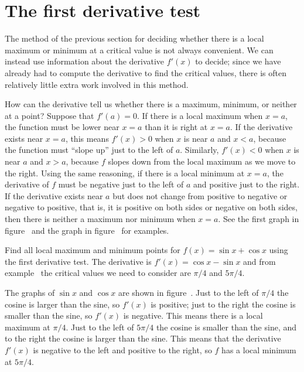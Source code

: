 \section{The first derivative test} {}{}
\nobreak
The method of the previous section for deciding whether there is a
local maximum or minimum at a critical value is not always
convenient. We can instead use information about the derivative
$f'(x)$ to decide; since we have already had to compute the derivative
to find the critical values, there is often relatively little extra
work involved in this method.

How can the derivative tell us whether there is a maximum, minimum, or
neither at a point? Suppose that $f'(a)=0$. If there is a local
maximum when $x=a$, the function must be lower near $x=a$ than it is
right at $x=a$. If the derivative exists near $x=a$, this means
$f'(x)>0$ when $x$ is near $a$ and $x<a$, because the function must
``slope up'' just to the left of $a$. Similarly, $f'(x)<0$ when $x$ is
near $a$ and $x>a$, because $f$ slopes down from the local maximum as
we move to the right. Using the same reasoning, if there is a local
minimum at $x=a$, the derivative of $f$ must be negative just to the
left of $a$ and positive just to the right. If the derivative exists
near $a$ but does not change from positive to negative or negative to
positive, that is, it is positive on both sides or negative on both
sides, then there is neither a maximum nor minimum when $x=a$.
See the first graph in figure~
and the graph in figure~
for examples.

\begin{example} Find all local maximum and minimum points for $f(x)=\sin x+\cos
x$ using the first derivative test.  The derivative is $f'(x)=\cos
x-\sin x$ and from example~ the critical
values we need to consider are $\pi/4$ and $5\pi/4$.

The graphs of $\sin x$ and $\cos x$ are shown in figure~. Just to the left of $\pi/4$ the cosine is larger than the
  sine, so $f'(x)$ is positive; just to the right the cosine is
  smaller than the sine, so $f'(x)$ is negative. This means there is a
  local maximum at $\pi/4$. Just to the left of $5\pi/4$ the cosine is
  smaller than the sine, and to the right the cosine is larger than
  the sine. This means that the derivative $f'(x)$ is negative to the
  left and positive to the right, so $f$ has a local minimum at
  $5\pi/4$.
\end{example}

